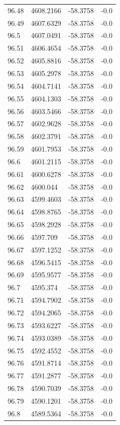\begin{table}[H]
\begin{tabular}{llll}
96.48 & 4608.2166 & -58.3758 & -0.0 \\
96.49 & 4607.6329 & -58.3758 & -0.0 \\
96.5 & 4607.0491 & -58.3758 & -0.0 \\
96.51 & 4606.4654 & -58.3758 & -0.0 \\
96.52 & 4605.8816 & -58.3758 & -0.0 \\
96.53 & 4605.2978 & -58.3758 & -0.0 \\
96.54 & 4604.7141 & -58.3758 & -0.0 \\
96.55 & 4604.1303 & -58.3758 & -0.0 \\
96.56 & 4603.5466 & -58.3758 & -0.0 \\
96.57 & 4602.9628 & -58.3758 & -0.0 \\
96.58 & 4602.3791 & -58.3758 & -0.0 \\
96.59 & 4601.7953 & -58.3758 & -0.0 \\
96.6 & 4601.2115 & -58.3758 & -0.0 \\
96.61 & 4600.6278 & -58.3758 & -0.0 \\
96.62 & 4600.044 & -58.3758 & -0.0 \\
96.63 & 4599.4603 & -58.3758 & -0.0 \\
96.64 & 4598.8765 & -58.3758 & -0.0 \\
96.65 & 4598.2928 & -58.3758 & -0.0 \\
96.66 & 4597.709 & -58.3758 & -0.0 \\
96.67 & 4597.1252 & -58.3758 & -0.0 \\
96.68 & 4596.5415 & -58.3758 & -0.0 \\
96.69 & 4595.9577 & -58.3758 & -0.0 \\
96.7 & 4595.374 & -58.3758 & -0.0 \\
96.71 & 4594.7902 & -58.3758 & -0.0 \\
96.72 & 4594.2065 & -58.3758 & -0.0 \\
96.73 & 4593.6227 & -58.3758 & -0.0 \\
96.74 & 4593.0389 & -58.3758 & -0.0 \\
96.75 & 4592.4552 & -58.3758 & -0.0 \\
96.76 & 4591.8714 & -58.3758 & -0.0 \\
96.77 & 4591.2877 & -58.3758 & -0.0 \\
96.78 & 4590.7039 & -58.3758 & -0.0 \\
96.79 & 4590.1201 & -58.3758 & -0.0 \\
96.8 & 4589.5364 & -58.3758 & -0.0 \\

\end{tabular}
\end{table}
